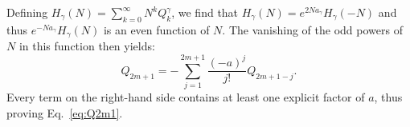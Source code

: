 \documentclass[9pt,twocolumn,twoside]{gsajnl}
\newcommand{\Dop}{\mathcal D}
\newcommand{\Sop}{\mathcal S}
\begin{document}
Defining $H_\gamma (N) = \sum_{k=0}^{\infty} N^k Q_k^\gamma$, we find that $H_\gamma (N) = e^{2Na_\gamma} H_\gamma (-N)$ and thus
$e^{-Na_\gamma} H_\gamma (N)$ is an even function of $N$. The vanishing of the odd powers of $N$ in this function then yields:
\begin{equation}
Q_{2m+1} = - \sum_{j=1}^{2m+1} \frac{(-a)^j}{j!} Q_{2m+1-j}.
\end{equation}
Every term on the right-hand side contains at least one explicit factor of $a$, thus proving Eq.~\eqref{eq:Q2m1}.




\end{document}
